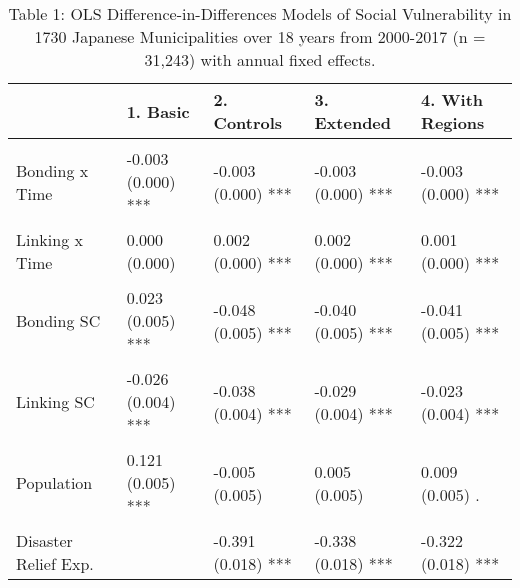\documentclass[]{elsarticle} %
\begin{document}
\begin{table}

\caption{Table 1: OLS Difference-in-Differences Models of Social Vulnerability in 1730 Japanese Municipalities over 18 years from 2000-2017 (n = 31,243) with annual fixed effects.}
\begin{threeparttable}
\begin{tabular}[t]{lllll}
\toprule
 & 1. Basic & 2. Controls & 3. Extended & 4. With Regions\\
\midrule
\textbf{\cellcolor{gray!6}{Treatment Effects}} & \textbf{\cellcolor{gray!6}{}} & \textbf{\cellcolor{gray!6}{}} & \textbf{\cellcolor{gray!6}{}} & \textbf{\cellcolor{gray!6}{}}\\
Bonding x Time & -0.003 (0.000) *** & -0.003 (0.000) *** & -0.003 (0.000) *** & -0.003 (0.000) ***\\
\cellcolor{gray!6}{Bridging x Time} & \cellcolor{gray!6}{-0.000 (0.000)} & \cellcolor{gray!6}{-0.000 (0.000)} & \cellcolor{gray!6}{0.000 (0.000)} & \cellcolor{gray!6}{0.000 (0.000)}\\
Linking x Time & 0.000 (0.000) & 0.002 (0.000) *** & 0.002 (0.000) *** & 0.001 (0.000) ***\\
\textbf{\cellcolor{gray!6}{Direct Effects}} & \textbf{\cellcolor{gray!6}{}} & \textbf{\cellcolor{gray!6}{}} & \textbf{\cellcolor{gray!6}{}} & \textbf{\cellcolor{gray!6}{}}\\
\addlinespace
Bonding SC & 0.023 (0.005) *** & -0.048 (0.005) *** & -0.040 (0.005) *** & -0.041 (0.005) ***\\
\cellcolor{gray!6}{Bridging SC} & \cellcolor{gray!6}{0.011 (0.002) ***} & \cellcolor{gray!6}{0.045 (0.002) ***} & \cellcolor{gray!6}{0.032 (0.002) ***} & \cellcolor{gray!6}{0.022 (0.002) ***}\\
Linking SC & -0.026 (0.004) *** & -0.038 (0.004) *** & -0.029 (0.004) *** & -0.023 (0.004) ***\\
\textbf{\cellcolor{gray!6}{Controls}} & \textbf{\cellcolor{gray!6}{}} & \textbf{\cellcolor{gray!6}{}} & \textbf{\cellcolor{gray!6}{}} & \textbf{\cellcolor{gray!6}{}}\\
Population & 0.121 (0.005) *** & -0.005 (0.005) & 0.005 (0.005) & 0.009 (0.005) .\\
\addlinespace
\cellcolor{gray!6}{Financial Strength} & \cellcolor{gray!6}{} & \cellcolor{gray!6}{0.084 (0.002) ***} & \cellcolor{gray!6}{0.090 (0.002) ***} & \cellcolor{gray!6}{0.089 (0.003) ***}\\
Disaster Relief Exp. &  & -0.391 (0.018) *** & -0.338 (0.018) *** & -0.322 (0.018) ***\\

\end{tabular}
\end{threeparttable}
\end{table}
\end{document}
